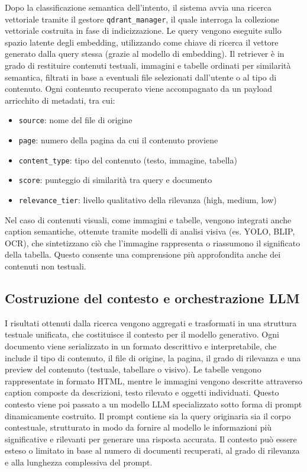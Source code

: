 Dopo la classificazione semantica dell’intento, il sistema avvia una ricerca vettoriale tramite il gestore \verb|qdrant_manager|, il quale interroga la collezione vettoriale costruita in fase di indicizzazione. Le query vengono eseguite sullo spazio latente degli embedding, utilizzando come chiave di ricerca il vettore generato dalla query stessa (grazie al modello di embedding). Il retriever è in grado di restituire contenuti testuali, immagini e tabelle ordinati per similarità semantica, filtrati in base a eventuali file selezionati dall’utente o al tipo di contenuto.
Ogni contenuto recuperato viene accompagnato da un payload arricchito di metadati, tra cui:
\begin{itemize}
    \item \verb|source|: nome del file di origine
    \item \verb|page|: numero della pagina da cui il contenuto proviene
    \item \verb|content_type|: tipo del contenuto (testo, immagine, tabella)
    \item \verb|score|: punteggio di similarità tra query e documento
    \item \verb|relevance_tier|: livello qualitativo della rilevanza (high, medium, low)
\end{itemize}
Nel caso di contenuti visuali, come immagini e tabelle, vengono integrati anche caption semantiche, ottenute tramite modelli di analisi visiva (es. YOLO, BLIP, OCR), che sintetizzano ciò che l’immagine rappresenta o riassumono il significato della tabella. Questo consente una comprensione più approfondita anche dei contenuti non testuali.

\subsection{Costruzione del contesto e orchestrazione LLM}
I risultati ottenuti dalla ricerca vengono aggregati e trasformati in una struttura testuale unificata, che costituisce il contesto per il modello generativo. Ogni documento viene serializzato in un formato descrittivo e interpretabile, che include il tipo di contenuto, il file di origine, la pagina, il grado di rilevanza e una preview del contenuto (testuale, tabellare o visivo). Le tabelle vengono rappresentate in formato HTML, mentre le immagini vengono descritte attraverso caption composte da descrizioni, testo rilevato e oggetti individuati.
Questo contesto viene poi passato a un modello LLM specializzato  sotto forma di prompt dinamicamente costruito. Il prompt contiene sia la query originaria sia il corpo contestuale, strutturato in modo da fornire al modello le informazioni più significative e rilevanti per generare una risposta accurata. Il contesto può essere esteso o limitato in base al numero di documenti recuperati, al grado di rilevanza e alla lunghezza complessiva del prompt.
